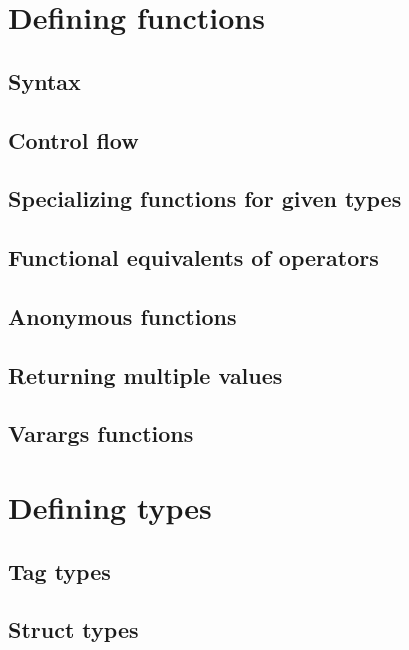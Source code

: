 \documentclass{article}
\begin{document}
\section{Defining functions}
\subsection{Syntax}
\subsection{Control flow}
\subsection{Specializing functions for given types}
\subsection{Functional equivalents of operators}
\subsection{Anonymous functions}
\subsection{Returning multiple values}
\subsection{Varargs functions}
\section{Defining types}
\subsection{Tag types}
\subsection{Struct types}
\subsection{Struct constructors}
\subsection{Bits types}
\subsection{Converting and promoting types}
\end{document}
